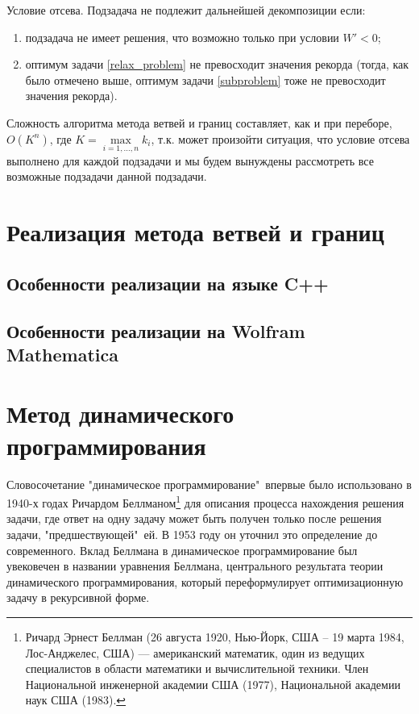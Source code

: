 \documentclass[12pt, a4paper]{article}
\begin{document}
	Условие отсева. Подзадача не подлежит дальнейшей декомпозиции если:
	\begin{enumerate}
		\item подзадача не имеет решения, что возможно только при условии $W' < 0$;
		\item оптимум задачи \eqref{relax_problem} не превосходит значения рекорда (тогда, как было отмечено выше, оптимум задачи \eqref{subproblem} тоже не превосходит значения рекорда).
	\end{enumerate}
	
	Сложность алгоритма метода ветвей и границ составляет, как и при переборе,~$O(K^n)$, где $K = \max\limits_{i=1,\dots,n} k_i$, т.к. может произойти ситуация, что условие отсева выполнено для каждой подзадачи и мы будем вынуждены рассмотреть все возможные подзадачи данной подзадачи.
	
	\section{Реализация метода ветвей и границ}
	
	\subsection{Особенности реализации на языке C++}
	
	
	\subsection{Особенности реализации на Wolfram Mathematica}
	
	
	\section{Метод динамического программирования}
	Словосочетание "динамическое программирование"\, впервые было использовано в 1940-х годах Ричардом Беллманом\footnote{Ричард Эрнест Беллман (26 августа 1920, Нью-Йорк, США -- 19 марта 1984, Лос-Анджелес, США) --- американский математик, один из ведущих специалистов в области математики и вычислительной техники. Член Национальной инженерной академии США (1977), Национальной академии наук США (1983).} для описания процесса нахождения решения задачи, где ответ на одну задачу может быть получен только после решения задачи, "предшествующей"\, ей. В 1953 году он уточнил это определение до современного. Вклад Беллмана в динамическое программирование был увековечен в названии уравнения Беллмана, центрального результата теории динамического программирования, который переформулирует оптимизационную задачу в рекурсивной форме.
	
\end{document}
